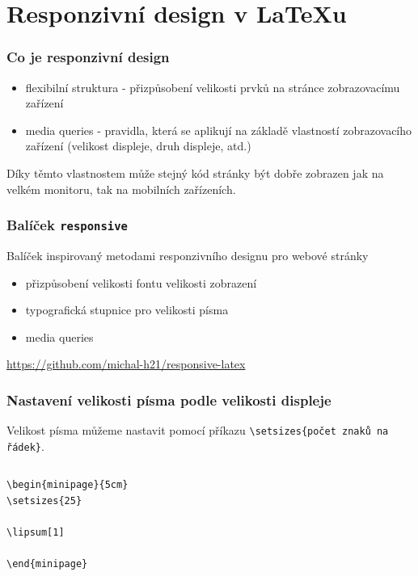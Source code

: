 \section{Responzivní design v \LaTeX u}

\begin{frame}
   \frametitle{Co je responzivní design}
   \begin{itemize}
     \item flexibilní struktura - přizpůsobení velikosti prvků na stránce zobrazovacímu zařízení
     \item media queries - pravidla, která se aplikují na základě vlastností zobrazovacího zařízení (velikost displeje, druh displeje, atd.) 
   \end{itemize}

   Díky těmto vlastnostem může stejný kód stránky být dobře zobrazen jak na velkém monitoru, tak na mobilních zařízeních.
\end{frame}

\begin{frame}
  \frametitle{Balíček \texttt{responsive}}

  Balíček inspirovaný metodami responzivního designu pro webové stránky
  \begin{itemize}
  \item přizpůsobení velikosti fontu velikosti zobrazení
  \item typografická stupnice pro velikosti písma
  \item media queries
\end{itemize}
  \url{https://github.com/michal-h21/responsive-latex}
\end{frame}


\begin{frame}[fragile]
  \frametitle{Nastavení velikosti písma podle velikosti displeje}

  Velikost písma můžeme nastavit pomocí příkazu \verb|\setsizes{počet znaků na řádek}|.
  

\begin{columns}
  \begin{column}{0.5\textwidth}
\begin{verbatim}
\begin{minipage}{5cm}
\setsizes{25}

\lipsum[1]

\end{minipage}
\end{verbatim}
\end{column}
\begin{column}{0.5\textwidth}
\end{column}
\end{columns}

\end{frame}

